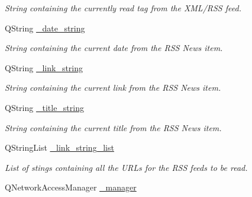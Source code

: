 \begin{DoxyCompactItemize}
\begin{DoxyCompactList}\small\item\em String containing the currently read tag from the X\+M\+L/\+R\+S\+S feed. \end{DoxyCompactList}\item 
\hypertarget{class_rss_client_ac9ec3cd22441d8e597702e73c7a67339}{Q\+String \hyperlink{class_rss_client_ac9ec3cd22441d8e597702e73c7a67339}{\+\_\+date\+\_\+string}}\label{class_rss_client_ac9ec3cd22441d8e597702e73c7a67339}

\begin{DoxyCompactList}\small\item\em String containing the current date from the R\+S\+S News item. \end{DoxyCompactList}\item 
\hypertarget{class_rss_client_a13193830f4d917c6f891a3e75433e72b}{Q\+String \hyperlink{class_rss_client_a13193830f4d917c6f891a3e75433e72b}{\+\_\+link\+\_\+string}}\label{class_rss_client_a13193830f4d917c6f891a3e75433e72b}

\begin{DoxyCompactList}\small\item\em String containing the current link from the R\+S\+S News item. \end{DoxyCompactList}\item 
\hypertarget{class_rss_client_a3ad6f30274197c57d29bbd884b28420d}{Q\+String \hyperlink{class_rss_client_a3ad6f30274197c57d29bbd884b28420d}{\+\_\+title\+\_\+string}}\label{class_rss_client_a3ad6f30274197c57d29bbd884b28420d}

\begin{DoxyCompactList}\small\item\em String containing the current title from the R\+S\+S News item. \end{DoxyCompactList}\item 
\hypertarget{class_rss_client_a2ea54b1553fd8eaa6bb04e2ef829f6eb}{Q\+String\+List \hyperlink{class_rss_client_a2ea54b1553fd8eaa6bb04e2ef829f6eb}{\+\_\+link\+\_\+string\+\_\+list}}\label{class_rss_client_a2ea54b1553fd8eaa6bb04e2ef829f6eb}

\begin{DoxyCompactList}\small\item\em List of stings containing all the U\+R\+Ls for the R\+S\+S feeds to be read. \end{DoxyCompactList}\item 
\hypertarget{class_rss_client_ac97d045a18b36d5c00b44180111ae6bb}{Q\+Network\+Access\+Manager \hyperlink{class_rss_client_ac97d045a18b36d5c00b44180111ae6bb}{\+\_\+manager}}\label{class_rss_client_ac97d045a18b36d5c00b44180111ae6bb}


\end{DoxyCompactItemize}
